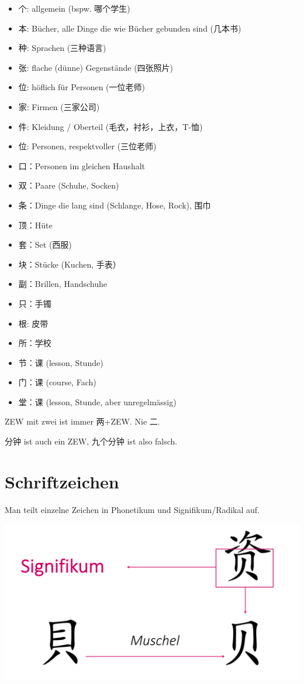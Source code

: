 \documentclass[UTF8]{ctexart}
\begin{document}
\begin{itemize}
    \item 个: allgemein (bspw. 哪个学生)
    \item 本: Bücher, alle Dinge die wie Bücher gebunden sind (几本书)
    \item 种: Sprachen (三种语言)
    \item 张: flache (dünne) Gegenstände (四张照片)
    \item 位: höflich für Personen (一位老师)
    \item 家: Firmen (三家公司)
    \item 件: Kleidung / Oberteil (毛衣，衬衫，上衣，T-恤)
    \item 位: Personen, respektvoller (三位老师)
    \item 口：Personen im gleichen Haushalt
    \item 双：Paare (Schuhe, Socken)
    \item 条：Dinge die lang sind (Schlange, Hose, Rock), 围巾
    \item 顶：Hüte
    \item 套：Set (西服)
    \item 块：Stücke (Kuchen, 手表）
    \item 副：Brillen, Handschuhe
    \item 只：手镯
    \item 根: 皮带
    \item 所：学校
    \item 节：课 (lesson, Stunde)
    \item 门：课 (course, Fach)
    \item 堂：课 (lesson, Stunde, aber unregelmässig)
\end{itemize}

ZEW mit zwei ist immer 两+ZEW. Nie 二.

分钟 ist auch ein ZEW, 九个分钟 ist also falsch.

\section{Schriftzeichen}

Man teilt einzelne Zeichen in Phonetikum und Signifikum/Radikal auf.

\includegraphics[width=\linewidth]{signifikum.png}
\end{document}
